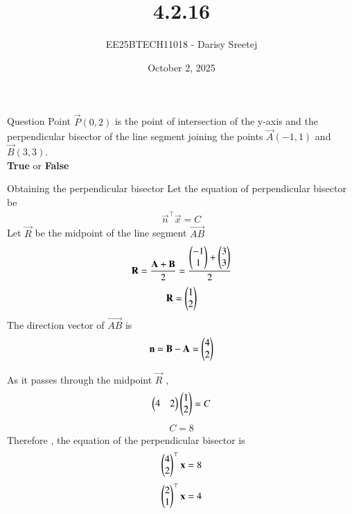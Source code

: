 \documentclass{beamer}
\title %
{4.2.16}
\date{October 2, 2025}
\author %
{EE25BTECH11018 - Darisy Sreetej}
\begin{document}
\frame{\titlepage}

\begin{frame}{Question}
Point $\vec{P}(0, 2)$ is the point of intersection of the y-axis and the perpendicular bisector of the line segment joining the points $\vec{A}(-1,1)$ and $\vec{B}(3,3).$\\
\textbf{True} or \textbf{False}
\end{frame}
\begin{frame}
    \begin{table}[H]
	\centering
	\caption{}
	
	\label{}
\end{table}
\end{frame}
\begin{frame}{Obtaining the perpendicular bisector}
Let the equation of perpendicular bisector be
\begin{align}
	\vec{n}^\top\vec{x}=C
\end{align}
Let $\vec{R}$ be the midpoint of the line segment $\vec{AB}$
\begin{align}
    \mathbf{R}=\frac{\mathbf{A}+\mathbf{B}}{2} = \frac{\begin{pmatrix}-1\\1\end{pmatrix}+\begin{pmatrix}3\\3\end{pmatrix}}{2}
\end{align}
\begin{align}
    \mathbf{R}=\begin{pmatrix}1\\2\end{pmatrix}
\end{align}
The direction vector of $\vec{AB}$ is 
\begin{align}
	\mathbf{n}=\mathbf{B}-\mathbf{A}=\begin{pmatrix}4\\2\end{pmatrix}
\end{align}
\end{frame}
\begin{frame}
As it passes through the midpoint $\vec{R}$ ,
\begin{align}
\begin{pmatrix}4&2\end{pmatrix}\begin{pmatrix}1\\2\end{pmatrix}=C
\end{align}
\begin{align}
	C=8
\end{align}
Therefore , the equation of the perpendicular bisector is 
\begin{align}
	\begin{pmatrix}4\\2\end{pmatrix}^\top\mathbf{x}=8
\end{align}
\begin{align}
	\begin{pmatrix}2\\1\end{pmatrix}^\top\mathbf{x}=4
\end{align}
\end{frame}
\end{document}
